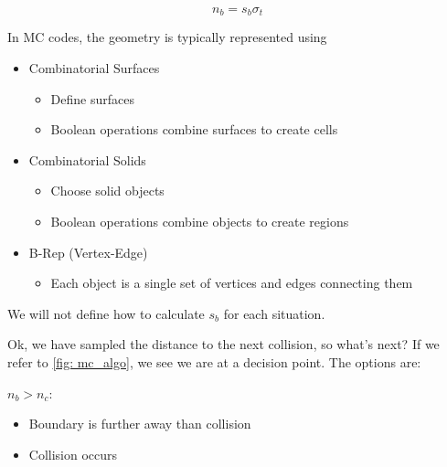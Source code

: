 \documentclass[12pt]{article}
\begin{document}
\begin{equation}
  n_b = s_b \sigma_t
\end{equation}

In MC codes, the geometry is typically represented using 

\begin{itemize}
  \item Combinatorial Surfaces
  \begin{itemize}
    \item Define surfaces
    \item Boolean operations combine surfaces to create cells
  \end{itemize}
  \vspace*{1 em}
  \item Combinatorial Solids
  \begin{itemize}
    \item Choose solid objects
    \item Boolean operations combine objects to create regions
  \end{itemize}
  \vspace*{1 em}
  \item B-Rep (Vertex-Edge)
  \begin{itemize}
    \item Each object is a single set of vertices and edges connecting them
  \end{itemize}
\end{itemize}

We will not define how to calculate $s_b$ for each situation.

Ok, we have sampled the distance to the next collision, so what's next?
If we refer to \autoref{fig: mc_algo}, we see we are at a decision point.
The options are:

\underline{$n_b > n_c$}:
\begin{itemize}
  \item Boundary is further away than collision
  \item Collision occurs
\end{itemize}
  \vspace*{0.5 em}
\end{document}
